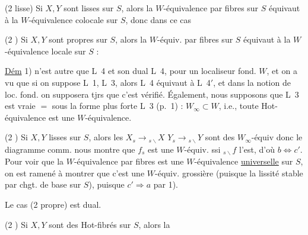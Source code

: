 (2 lisse) Si $X,Y$ sont lisses sur $S$, alors la $W$-équivalence par fibres sur $S$ équivaut à la $W$-équivalence colocale sur $S$,  donc dans ce cas

(2 ) Si $X,Y$ sont propres sur $S$, alors la $W$-équiv. par fibres sur $S$ équivaut à la $W$-équivalence locale sur $S$ :

\uline{Dém} 1) n'est autre que L~4 et  son dual L~4, pour un localiseur fond. $W$, et on a vu que si on suppose L~1, L~3, alors L~4 équivaut à L~4$'$, et dans la notion de loc. fond. on supposera tjrs que c'est vérifié. Également, nous supposons que L~3 est vraie $=$ sous la forme plus forte L~3  (p.~1) : $W_\infty\subset W$, i.e., toute Hot-équivalence est une $W$-équivalence.

(2 ) Si $X,Y$ lisses sur $S$, alors les $X_s\longrightarrow{}_{s\backslash}X$ $Y_s\longrightarrow{}_{s\backslash}Y$ sont des $W_\infty$-équiv  donc le diagramme comm.
nous montre que $f_s$ est une $W$-équiv. ssi $ {}_{s\backslash}f$ l'est, d'où $b\Longleftrightarrow c'$. Pour voir que la $W$-équivalence par fibres est \inserted{$=$} une $W$-équivalence \uline{universelle} sur $S$,  on est ramené à montrer que c'est une $W$-équiv. grossière (puisque  la lissité stable par chgt. de base sur $S$),    puisque $c'\Rightarrow a$ par 1).

Le cas (2 propre) est dual.

(2 ) Si $X,Y$ sont des Hot-fibrés sur $S$, alors la
